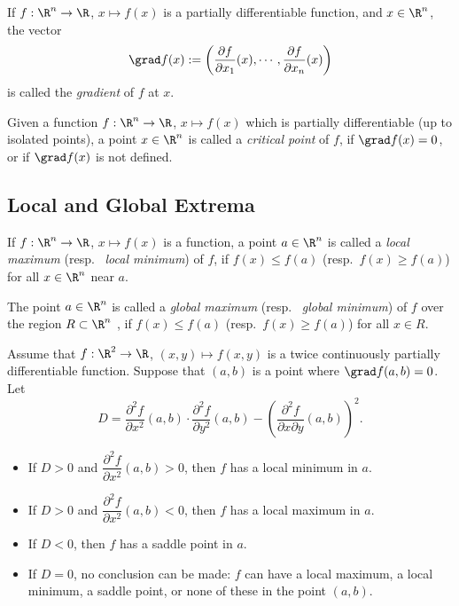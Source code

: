 \begin{definition}
  If $f:\R^n \rightarrow \R$, $x\mapsto f(x)$ is a partially differentiable function, 
  and $x\in \R^n$, the vector
  \begin{displaymath}
    \grad f (x) := \left( \frac{\partial f}{ \partial x_1} (x) , \cdots , 
    \frac{\partial f}{ \partial x_n} (x) \right) 
  \end{displaymath}
  is called the \emph{gradient} of $f$ at $x$.

  Given a function $f:\R^n \rightarrow \R$, $x\mapsto f(x)$ which 
  is partially differentiable (up to isolated points),
  a point $x\in \R^n$ is called a \emph{critical point} of $f$, if  $ \grad f (x) =0 $, or if 
  $ \grad f (x) $ is not defined. 
\end{definition}


\subsection{Local and Global Extrema}

\begin{definition}
   If $f:\R^n \rightarrow \R$, $x\mapsto f(x)$ is a function, a point $a\in \R^n$ is called
   a \emph{local maximum} (resp.~ \emph{local minimum}) of $f$, if
   $f(x)\leq f(a)$ (resp.~$f(x)\geq f(a)$) for all $x\in \R^n$ near $a$.

   The point $a\in \R^n$ is called a \emph{global maximum} (resp.~ \emph{global minimum}) of $f$
   over the region $R\subset \R^n$ , if $f(x)\leq f(a)$ (resp.~$f(x)\geq f(a)$) for all $x\in R$.
\end{definition}

\begin{theorem}
  Assume that $f:\R^2 \rightarrow \R$, $(x,y)\mapsto f(x,y)$ is a twice continuously partially 
  differentiable function.
  Suppose that $(a,b)$ is a point where $\grad f(a,b)=0$. Let 
  \[
        D = \dfrac{\partial^2f}{\partial x^2}(a,b)\cdot \dfrac{\partial^2f}{\partial y^2}(a,b) -
            \left( \dfrac{\partial^2f}{\partial x \partial y} (a,b) \right)^2 .
  \]
  \begin{itemize}
  \item If $D>0$ and $\dfrac{\partial^2f}{\partial x^2}(a,b)>0$, then $f$ has a local minimum in $a$.
  \item If $D>0$ and $\dfrac{\partial^2f}{\partial x^2}(a,b)<0$, then $f$ has a local maximum in $a$.
  \item If $D<0$, then $f$ has a saddle point in $a$.
  \item If $D=0$, no conclusion can be made: $f$ can have a local maximum, a local minimum, a saddle
  point, or none of these in the point $(a,b)$.  
  \end{itemize}
\end{theorem}
  

